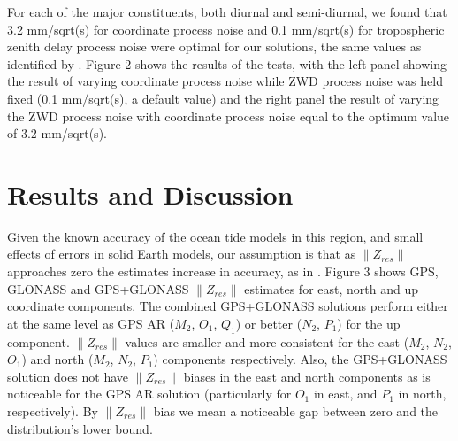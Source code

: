 \documentclass[se, manuscript]{copernicus}
\begin{document}
For each of the major constituents, both diurnal and semi-diurnal, we found that 3.2 mm/sqrt(s) for coordinate process noise and 0.1 mm/sqrt(s) for tropospheric zenith delay process noise were optimal for our solutions, the same values as identified by \cite{Penna2015}. Figure 2 shows the results of the tests, with the left panel showing the result of varying coordinate process noise while ZWD process noise was held fixed (0.1 mm/sqrt(s), a default value) and the right panel the result of varying the ZWD process noise with coordinate process noise equal to the optimum value of 3.2 mm/sqrt(s). 

\section{Results and Discussion}

Given the known accuracy of the ocean tide models in this region, and small effects of errors in solid Earth models, our assumption is that as $\|Z_{res}\|$ approaches zero the estimates increase in accuracy, as in \cite{Bos2015}. Figure 3 shows GPS, GLONASS and GPS+GLONASS $\|Z_{res}\|$ estimates for east, north and up coordinate components. The combined GPS+GLONASS solutions perform either at the same level as GPS AR ($M_2$, $O_1$, $Q_1$) or better ($N_2$, $P_1$) for the up component. $\|Z_{res}\|$ values are smaller and more consistent for the east ($M_2$, $N_2$, $O_1$) and north ($M_2$, $N_2$, $P_1$) components respectively.
Also, the GPS+GLONASS solution does not have $\|Z_{res}\|$ biases in the east and north components as is noticeable for the GPS AR solution (particularly for $O_1$ in east, and $P_1$ in north, respectively). By $\|Z_{res}\|$ bias we mean a noticeable gap between zero and the distribution’s lower bound.
\end{document}
